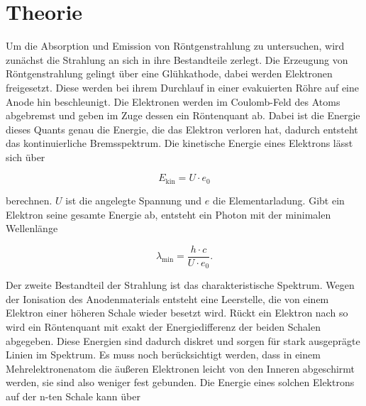 \section{Theorie}
\label{sec:Theorie}




Um die Absorption und Emission von Röntgenstrahlung zu untersuchen, wird zunächst die Strahlung an sich in ihre Bestandteile zerlegt.
Die Erzeugung von Röntgenstrahlung gelingt über eine Glühkathode, dabei werden Elektronen freigesetzt.
Diese werden bei ihrem Durchlauf in einer evakuierten Röhre auf eine Anode hin beschleunigt.
Die Elektronen werden im Coulomb-Feld des Atoms abgebremst und geben im Zuge dessen ein Röntenquant ab.
Dabei ist die Energie dieses Quants genau die Energie, die das Elektron verloren hat, dadurch entsteht das kontinuierliche Bremsspektrum.
Die kinetische Energie eines Elektrons lässt sich über 

\begin{equation}
    E_\text{kin} = U \cdot e_0
    \label{eq:ekin}
\end{equation}

berechnen. $U$ ist die angelegte Spannung und $e$ die Elementarladung.
Gibt ein Elektron seine gesamte Energie ab, entsteht ein Photon mit der minimalen Wellenlänge 

\begin{equation}
    \lambda _\text{min} = \frac{h \cdot c}{U \cdot e_0}.
    \label{eq:lambdamin}
\end{equation}

Der zweite Bestandteil der Strahlung ist das charakteristische Spektrum.
Wegen der Ionisation des Anodenmaterials entsteht eine Leerstelle, die von einem Elektron einer höheren Schale wieder besetzt wird.
Rückt ein Elektron nach so wird ein Röntenquant mit exakt der Energiedifferenz der beiden Schalen abgegeben.
Diese Energien sind dadurch diskret und sorgen für stark ausgeprägte Linien im Spektrum.
Es muss noch berücksichtigt werden, dass in einem Mehrelektronenatom die äußeren Elektronen leicht von den Inneren abgeschirmt werden, sie sind also weniger fest gebunden.
Die Energie eines solchen Elektrons auf der n-ten Schale kann über 

